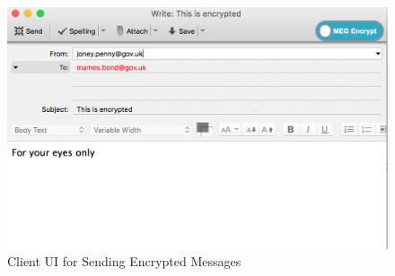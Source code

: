 \documentclass[10pt]{article}
\begin{document}
\begin{figure}[h]
    \centering
    \includegraphics[scale=.5]{encrypted-client-ui.png}
    \caption{Client UI for Sending Encrypted Messages}
    \label{fig:encrypted-ui}
\end{figure}
\end{document}
